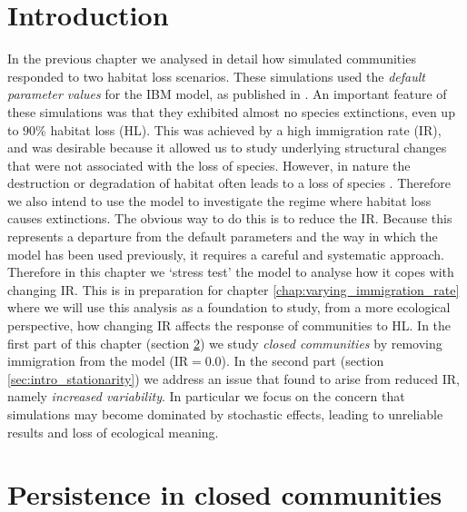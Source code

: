 \section{Introduction}

In the previous chapter we analysed in detail how simulated communities responded to two habitat loss scenarios. These simulations used the \emph{default parameter values} for the IBM model, as published in \cite{lurgi2015effects}. An important feature of these simulations was that they exhibited almost no species extinctions, even up to $90\%$ habitat loss (HL). This was achieved by a high immigration rate (IR), and was desirable because it allowed us to study underlying structural changes that were not associated with the loss of species. However, in nature the destruction or degradation of habitat often leads to a loss of species \cite{newbold2015global, foley2005global}. Therefore we also intend to use the model to investigate the regime where habitat loss causes extinctions. The obvious way to do this is to reduce the IR. Because this represents a departure from the default parameters and the way in which the model has been used previously, it requires a careful and systematic approach. Therefore in this chapter we `stress test' the model to analyse how it copes with changing IR. This is in preparation for chapter \ref{chap:varying_immigration_rate} where we will use this analysis as a foundation to study, from a more ecological perspective, how changing IR affects the response of communities to HL. In the first part of this chapter (section \ref{sec:closed_communities}) we study \emph{closed communities} by removing immigration from the model (IR$=0.0$). In the second part (section \ref{sec:intro_stationarity}) we address an issue that found to arise from reduced IR, namely \emph{increased variability}. In particular we focus on the concern that simulations may become dominated by stochastic effects, leading to unreliable results and loss of ecological meaning.

\section{Persistence in closed communities}
\label{sec:closed_communities}

